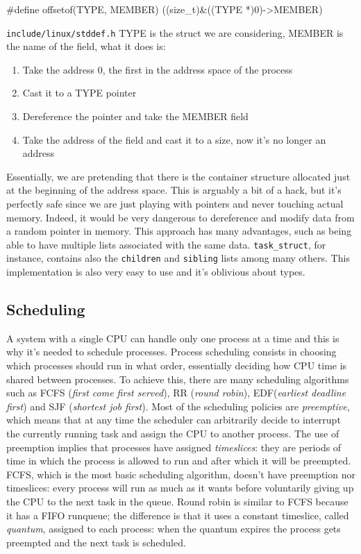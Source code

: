 \documentclass[10pt]{book}
\begin{document}
\begin{code}
#define offsetof(TYPE, MEMBER) ((size_t)&((TYPE *)0)->MEMBER)
\end{code}
\verb|include/linux/stddef.h|
TYPE is the struct we are considering, MEMBER is the name of the field, what it does is:
\begin{enumerate}
    \item Take the address 0, the first in the address space of the process
    \item Cast it to a TYPE pointer 
    \item Dereference the pointer and take the MEMBER field
    \item Take the address of the field and cast it to a size, now it's no longer an address
\end{enumerate}
Essentially, we are pretending that there is the container structure allocated just at the beginning of the address space. This is arguably a bit of a hack, but it's perfectly safe since we are just playing with pointers and never touching actual memory. Indeed, it would be very dangerous to dereference and modify data from a random pointer in memory. This approach has many advantages, such as being able to have multiple lists associated with the same data. \verb|task_struct|, for instance, contains also the \verb|children| and \verb|sibling| lists among many others. This implementation is also very easy to use and it's oblivious about types.

\subsection{Scheduling} A system with a single CPU can handle only one process at a time and this is why it's needed to schedule processes. Process scheduling consists in choosing which processes should run in what order, essentially deciding how CPU time is shared between processes. To achieve this, there are many scheduling algorithms such as FCFS (\textit{first come first served}), RR (\textit{round robin}), EDF(\textit{earliest deadline first}) and SJF (\textit{shortest job first}). Most of the scheduling policies are \textit{preemptive}, which means that at any time the scheduler can arbitrarily decide to interrupt the currently running task and assign the CPU to another process. The use of preemption implies that processes have assigned \textit{timeslices}: they are periods of time in which the process is allowed to run and after which it will be preempted. FCFS, which is the most basic scheduling algorithm, doesn't have preemption nor timeslices: every process will run as much as it wants before voluntarily giving up the CPU to the next task in the queue. Round robin is similar to FCFS because it has a FIFO runqueue; the difference is that it uses a constant timeslice, called \textit{quantum}, assigned to each process: when the quantum expires the process gets preempted and the next task is scheduled.
\end{document}
